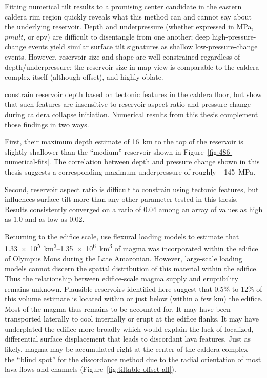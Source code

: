Fitting numerical tilt results to a promising center candidate in the eastern caldera rim region quickly reveals what this method can and cannot say about the underlying reservoir. Depth and underpressure (whether expressed in \unit{\mega\Pa}, $pmult$, or \acs{epv}) are difficult to disentangle from one another; deep high-pressure-change events yield similar surface tilt signatures as shallow low-pressure-change events. However, reservoir size and shape are well constrained regardless of depth/underpressure: the reservoir size in map view is comparable to the caldera complex itself (although offset), and highly oblate.

\textcite{zuber_caldera_1992} constrain reservoir depth based on tectonic features in the caldera floor, but show that such features are insensitive to reservoir aspect ratio and pressure change during caldera collapse initiation. Numerical results from this thesis complement those findings in two ways. 

First, their maximum depth estimate of \qty{16}{\km} to the top of the reservoir is slightly shallower than the ``medium'' reservoir shown in Figure~\ref{fig:486-numerical-fits}. The correlation between depth and pressure change shown in this thesis suggests a corresponding maximum underpressure of roughly \qty{-145}{\mega\Pa}.  

Second, reservoir aspect ratio is difficult to constrain using tectonic features, but influences surface tilt more than any other parameter tested in this thesis. Results consistently converged on a ratio of 0.04 among an array of values as high as 1.0 and as low as 0.02. 

Returning to the edifice scale, \textcite{chadwick_late_2015} use flexural loading models to estimate that \qtyrange{1.33e5}{1.35e6}{\km\cubed} of magma was incorporated within the edifice of Olympus Mons during the Late Amazonian. However, large-scale loading models cannot discern the spatial distribution of this material within the edifice. Thus the relationship between edifice-scale magma supply and eruptibility remains unknown. Plausible reservoirs identified here suggest that 0.5\% to 12\% of this volume estimate is located within or just below (within a few km) the edifice. Most of the magma thus remains to be accounted for. It may have been transported laterally to cool internally or erupt at the edifice flanks. It may have underplated the edifice more broadly which would explain the lack of localized, differential surface displacement that leads to discordant lava features. Just as likely, magma may be accumulated right at the center of the caldera complex---the ``blind spot'' for the discordance method due to the radial orientation of most lava flows and channels (Figure~\ref{fig:tiltable-offset-all}).

